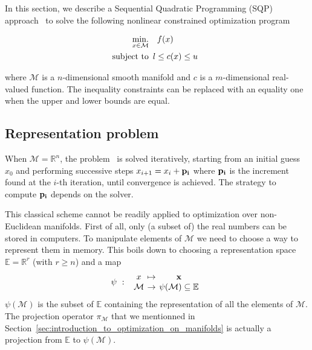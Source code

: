 In this section, we describe a Sequential Quadratic Programming (SQP) approach~\cite{nocedal:book:2006} to solve the following nonlinear constrained optimization program

\begin{align}
\label{eq:optim_problem}
  \operatorname*{min.}_{x \in \mathcal{M}} & \quad f(x)\\
  \text{subject to}&
  \begin{array}{lr}
    l \leq c(x) \leq u \nonumber
  \end{array}
\end{align}

where $\mathcal{M}$ is a $n$-dimensional smooth manifold and $c$ is a $m$-dimensional real-valued function.
The inequality constraints can be replaced with an equality one when the upper and lower bounds are equal.

\subsection{Representation problem}
When $\mathcal{M} = \mathbb{R}^n$, the problem~ is solved iteratively, starting from an initial guess $x_0$ and performing successive steps $x_{i+1} = x_i + {\bf p_i}$ where ${\bf p_i}$ is the increment found at the $i$-th iteration, until convergence is achieved.
The strategy to compute ${\bf p_i}$ depends on the solver.

This classical scheme cannot be readily applied to optimization over non-Euclidean manifolds.
First of all, only (a subset of) the real numbers can be stored in computers.
To manipulate elements of $\mathcal{M}$ we need to choose a way to represent them in memory.
This boils down to choosing a representation space $\mathbb{E} = \mathbb{R}^r$ (with $r \geq n$) and a map
\begin{equation}
  \psi\ :\
  \begin{array}{ccc}
    x & \reduce{\mapsto}{6} & \mathbf{x} \\
    \mathcal{M} & \reduce{\rightarrow}{6} & \psi(\mathcal{M}) \subseteq \mathbb{E}
  \end{array}\nonumber%
\end{equation}
$\psi(\mathcal{M})$ is the subset of $\mathbb{E}$ containing the representation of all the elements of $\mathcal{M}$.
The projection operator $\pi_\mathcal{M}$ that we mentionned in Section~\ref{sec:introduction_to_optimization_on_manifolds} is actually a projection from $\mathbb{E}$ to $\psi(\mathcal{M})$.

